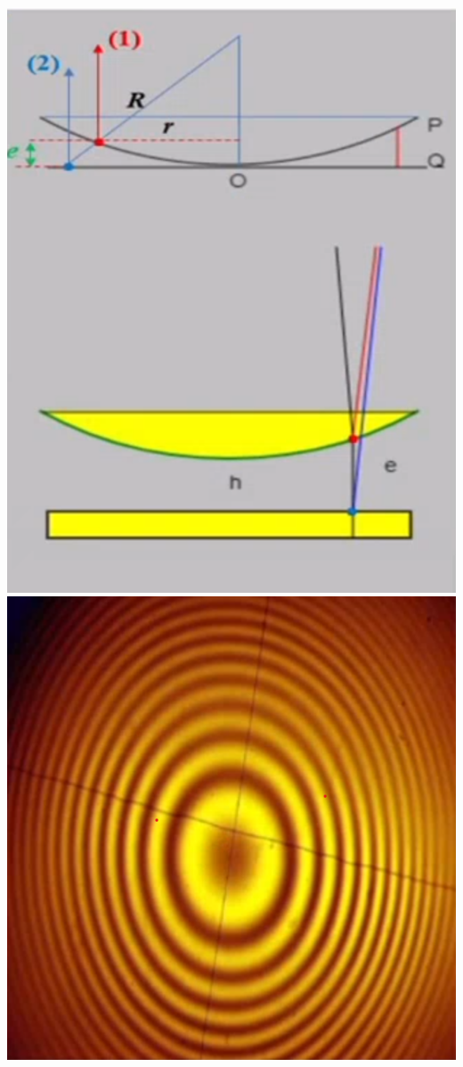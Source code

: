 \documentclass[12pt]{book}
\begin{document}
\begin{center}
\begin{minipage}{0.3\linewidth}
                    \includegraphics[width=\linewidth]{pic/newtonring1.png}
                    \\
                    \includegraphics[width=\linewidth]{pic/newtonring2.png}
                \end{minipage}
            \end{center}
\end{document}
